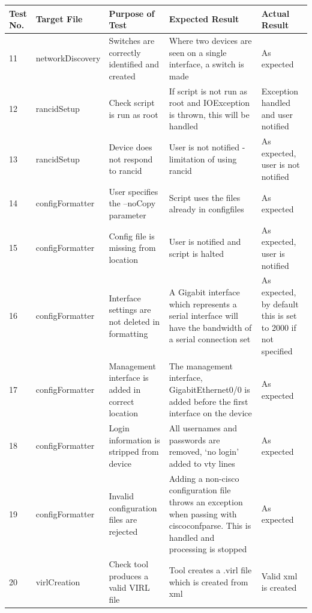 \documentclass[11pt]{report}
\begin{document}
\FloatBarrier

\begin{tabular}{|p{0.6cm}|p{3.0cm}|p{3cm}|p{3.5cm}|p{3.5cm}|}
	\hline \textbf{Test No.} & \textbf{Target File} & \textbf{Purpose of Test} & \textbf{Expected Result} & \textbf{Actual Result} \\ 
	\hline 11 & networkDiscovery & Switches are correctly identified and created & Where two devices are seen on a single interface, a switch is made & As expected  \\ 
	\hline 12 & rancidSetup & Check script is run as root & If script is not run as root and IOException is thrown, this will be handled & Exception handled and user notified    \\ 
	\hline 13 & rancidSetup & Device does not respond to rancid & User is not notified - limitation of using rancid & As expected, user is not notified  \\ 
	\hline 14 & configFormatter & User specifies the --noCopy parameter & Script uses the files already in config\-files & As expected  \\ 
	\hline 15 & configFormatter & Config file is missing from location & User is notified and script is halted & As expected, user is notified  \\
	\hline 16 & configFormatter & Interface settings are not deleted in formatting & A Gigabit interface which represents a serial interface will have the bandwidth of a serial connection set & As expected, by default this is set to 2000 if not specified  \\
	\hline 17 & configFormatter & Management interface is added in correct location & The management interface, GigabitEthernet0/0 is added before the first interface on the device & As expected  \\
	\hline 18 & configFormatter & Login information is stripped from device & All usernames and passwords are removed, `no login' added to vty lines & As expected  \\
	\hline 19 & configFormatter & Invalid configuration files are rejected & Adding a non-cisco configuration file throws an exception when passing with ciscoconfparse. This is handled and processing is stopped & As expected  \\
	\hline 20 & virlCreation & Check tool produces a valid VIRL file & Tool creates a .virl file which is created from xml & Valid xml is created  \\
	\hline
\end{tabular}
\end{document}
